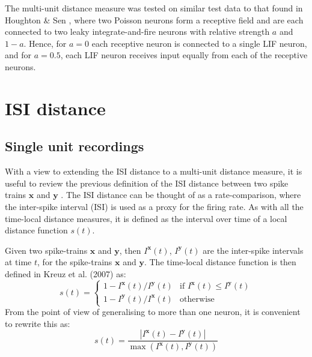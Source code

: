  The multi-unit distance measure was tested on similar test data to that found in Houghton \& Sen \cite{HoughtonSen2008}, where two Poisson neurons form a receptive field and are each connected to two leaky integrate-and-fire neurons with relative strength $a$ and $1-a$.  Hence, for $a=0$ each receptive neuron is connected to a single LIF neuron, and for $a=0.5$, each LIF neuron receives input equally from each of the receptive neurons.  
%
%
\newpage
\section{ISI distance}
\bigskip
\subsection{Single unit recordings}

With a view to extending the ISI distance to a multi-unit distance measure, it is useful to review the previous definition of the ISI distance between two spike trains $\mathbf{x}$ and $\mathbf{y}$ .  The ISI distance can be thought of as a rate-comparison, where the inter-spike interval (ISI) is used as a proxy for the firing rate.  As with all the time-local distance measures, it is defined as the interval over time of a local distance function $s(t)$.

Given two spike-trains $\mathbf{x}$ and $\mathbf{y}$, then $I^{\mathbf{x}}(t)$, $I^{\mathbf{y}}(t)$ are the inter-spike intervals at time $t$, for the spike-trains $\mathbf{x}$ and $\mathbf{y}$.  The time-local distance function is then defined in Kreuz et al. (2007) as:
\begin{equation}
s(t) = \left\{ \begin{array}{ll} 1-I^{\mathbf{x}}(t) / I^{\mathbf{y}}(t)  & \text{if } I^{\mathbf{x}}(t) \leq I^{\mathbf{y}}(t) \\ 1- I^{\mathbf{y}}(t) / I^{\mathbf{x}}(t)  & \text{otherwise} \end{array} \right.
\end{equation}
From the point of view of generalising to more than one neuron, it is convenient to rewrite this as:
\begin{equation}
s(t) = \frac{ | I^{\mathbf{x}}(t) - I^{\mathbf{y}}(t) | }{\max (I^{\mathbf{x}}(t), I^{\mathbf{y}}(t)) }
\end{equation}


